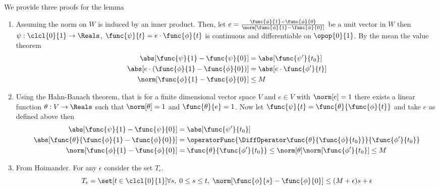 \begin{prooflemma}
    We provide three proofs for the lemma
    \begin{enumerate}
        \item Assuming the norm on \(W\) is induced by an inner product. Then, let \( e = \frac{\func{\phi}{1} - \func{\phi}{0}}{\norm[\func{\phi}{1} - \func{\phi}{0}]}\) be a unit vector in \(W\) then \(\psi : \clcl{0}{1} \to \Reals\), \(\func{\psi}{t} = e \cdot \func{\phi}{t}\) is continuous and differentiable on \(\opop{0}{1}\). By the mean the value theorem
              \begin{align*}
                  \abs[\func{\psi}{1} - \func{\psi}{0}]                        & = \abs[\func{\psi'}{t_0}]       \\
                  \abs[e \cdot \left( \func{\phi}{1} - \func{\phi}{0} \right)] & = \abs[e \cdot \func{\phi'}{t}] \\
                  \norm[\func{\phi}{1} - \func{\phi}{0}]                       & \leq M
              \end{align*}
        \item Using the Hahn-Banach theorem, that is for a finite dimensional vector space \(V\) and \(e \in V\) with \(\norm[e] = 1\) there exists a linear function \(\theta : V \to \Reals\) such that \(\norm[\theta] = 1\) and \(\func{\theta}{e} = 1\). Now let \(\func{\psi}{t} = \func{\theta}{\func{\phi}{t}}\) and take \(e\) as defined above then
              \begin{align*}
                  \abs[\func{\psi}{1} - \func{\psi}{0}]                & = \abs[\func{\psi'}{t_0}]                                                             \\
                  \abs[\func{\theta}{\func{\phi}{1} - \func{\phi}{0}}] & = \operatorFunc{\DiffOperator \func{\theta}{\func{\phi}{t_0}}}{\func{\phi'}{t_0}}     \\
                  \norm[\func{\phi}{1} - \func{\phi}{0}]               & = \func{\theta}{\func{\phi'}{t_0}} \leq \norm[\theta] \norm[\func{\phi'}{t_0}] \leq M
              \end{align*}
        \item From Hoimander. For any \(\epsilon\) consider the set \(T_\epsilon\).
              \begin{equation*}
                  T_\epsilon = \set[t \in \clcl{0}{1}]{\forall s, \; 0 \leq s \leq t, \; \norm[\func{\phi}{s} - \func{\phi}{0}] \leq(M + \epsilon)s + \epsilon}
              \end{equation*}

\end{enumerate}
\end{prooflemma}
